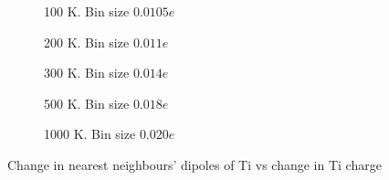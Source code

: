 \documentclass[11pt, a4paper]{report}
\begin{document}
\begin{figure}[h!]
\centering
	\begin{subfigure}[b]{0.45\textwidth}
	\hspace*{-0.4cm}
	
	\vspace*{-0.4cm}
	\caption{100 K. Bin size $0.0105e$}
	\end{subfigure}
	\hspace{0.6cm}
	\begin{subfigure}[b]{0.45\textwidth}
	\hspace*{-0.4cm}
	
	\vspace*{-0.4cm}
	\caption{200 K. Bin size $0.011e$}
	\end{subfigure}
	\quad
	\begin{subfigure}[b]{0.45\textwidth}
	\hspace*{-0.4cm}
	
    \vspace*{-0.4cm}
	\caption{300 K. Bin size $0.014e$}
	\end{subfigure}
	\hspace{0.6cm}
	\begin{subfigure}[b]{0.45\textwidth}
	\hspace*{-0.4cm}
	
    \vspace*{-0.4cm}
	\caption{500 K. Bin size $0.018e$}
	\end{subfigure}
	\quad
	\begin{subfigure}[b]{0.45\textwidth}
	\hspace*{-0.4cm}
	
    \vspace*{-0.4cm}
	\caption{1000 K. Bin size $0.020e$}
	\end{subfigure}
\caption{Change in nearest neighbours' dipoles of Ti vs change in Ti charge}
\label{on_site_PerrNN_vs_dq}
\end{figure}




%
\end{document}
